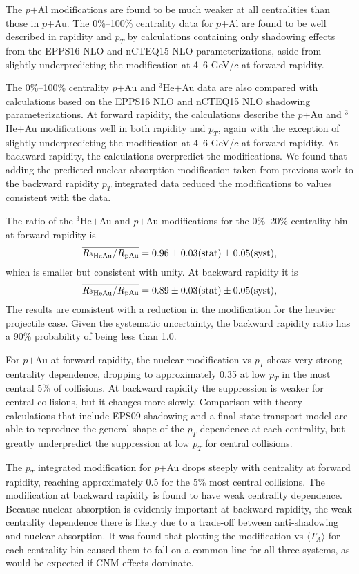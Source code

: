\documentclass[twocolumn,letterpaper,aps,prc,longbibliography,superscriptaddress,nofootinbib,floatfix]{revtex4-1}
\newcommand{\pt}{\mbox{$p_T$}\xspace}
\newcommand{\pau}{\mbox{$p$$+$Au}\xspace}
\newcommand{\pal}{\mbox{$p$$+$Al}\xspace}
\newcommand{\heau}{\mbox{$^{3}$He$+$Au}\xspace}
\begin{document}
The \pal modifications are found to be much weaker at all centralities 
than those in \pau. The 0\%--100\% centrality data for \pal are found to 
be well described in rapidity and \pt by calculations containing only 
shadowing effects from the EPPS16 NLO and nCTEQ15 NLO parameterizations, 
aside from slightly underpredicting the modification at 4--6 GeV/$c$ at 
forward rapidity.

The 0\%--100\% centrality \pau and \heau data are also compared with 
calculations based on the EPPS16 NLO and nCTEQ15 NLO shadowing 
parameterizations. At forward rapidity, the calculations describe the 
\pau and \heau modifications well in both rapidity and \pt, again with 
the exception of slightly underpredicting the modification at 4--6 
GeV/$c$ at forward rapidity. At backward rapidity, the calculations 
overpredict the modifications. We found that adding the predicted 
nuclear absorption modification taken from previous work to the backward 
rapidity \pt integrated data reduced the modifications to values 
consistent with the data.

The ratio of the \heau and \pau modifications for the 0\%--20\% 
centrality bin at forward rapidity is 
\begin{equation}
\overline{R_{^{3}{\rm HeAu}}/R_{{\rm pAu}}}
= 0.96\pm0.03{\rm (stat)}\pm0.05{\rm (syst)}, \nonumber
\end{equation}
which is smaller but consistent with unity.  At backward 
rapidity it is 
\begin{equation}
\overline{R_{^{3}{\rm HeAu}}/R_{{\rm pAu}}}
= 0.89\pm0.03{\rm (stat)}\pm0.05{\rm (syst)}, \nonumber
\end{equation}
The results are consistent with a reduction in the modification for the 
heavier projectile case. Given the systematic uncertainty, the backward 
rapidity ratio has a 90\% probability of being less than 1.0.
 
For \pau at forward rapidity, the nuclear modification vs \pt shows very 
strong centrality dependence, dropping to approximately 0.35 at low \pt 
in the most central 5\% of collisions. At backward rapidity the 
suppression is weaker for central collisions, but it changes more 
slowly. Comparison with theory calculations that include EPS09 shadowing 
and a final state transport model are able to reproduce the general 
shape of the \pt dependence at each centrality, but greatly underpredict 
the suppression at low \pt for central collisions.

The \pt integrated modification for \pau drops steeply with centrality 
at forward rapidity, reaching approximately 0.5 for the 5\% most central 
collisions. The modification at backward rapidity is found to have weak 
centrality dependence. Because nuclear absorption is evidently important 
at backward rapidity, the weak centrality dependence there is likely due 
to a trade-off between anti-shadowing and nuclear absorption. It was 
found that plotting the modification vs $\langle T_{A}\rangle$ for each 
centrality bin caused them to fall on a common line for all three 
systems, as would be expected if CNM effects dominate.
\end{document}
